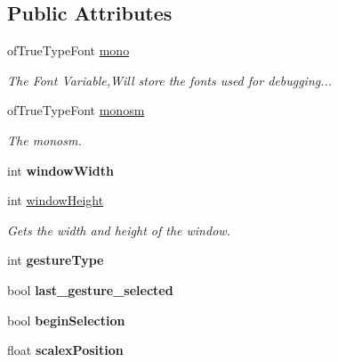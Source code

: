 \subsection*{Public Attributes}
\begin{DoxyCompactItemize}
\item 
\hypertarget{classtest_app_a9bcefa3afb830941451f72174a36b722}{of\-True\-Type\-Font \hyperlink{classtest_app_a9bcefa3afb830941451f72174a36b722}{mono}}\label{classtest_app_a9bcefa3afb830941451f72174a36b722}

\begin{DoxyCompactList}\small\item\em The Font Variable,Will store the fonts used for debugging... \end{DoxyCompactList}\item 
\hypertarget{classtest_app_afc42ad25d37b1292d27d783380249424}{of\-True\-Type\-Font \hyperlink{classtest_app_afc42ad25d37b1292d27d783380249424}{monosm}}\label{classtest_app_afc42ad25d37b1292d27d783380249424}

\begin{DoxyCompactList}\small\item\em The monosm. \end{DoxyCompactList}\item 
\hypertarget{classtest_app_a9ed611377cd46f5148a3a3d538e96484}{int {\bfseries window\-Width}}\label{classtest_app_a9ed611377cd46f5148a3a3d538e96484}

\item 
int \hyperlink{classtest_app_a31efaa85f8a900bb659a537d56c73e03}{window\-Height}
\begin{DoxyCompactList}\small\item\em Gets the width and height of the window. \end{DoxyCompactList}\item 
\hypertarget{classtest_app_a0db6626782419f4340a3186e51788074}{int {\bfseries gesture\-Type}}\label{classtest_app_a0db6626782419f4340a3186e51788074}

\item 
\hypertarget{classtest_app_a75ac9dc8ee1df4ae07b93a9b74131924}{bool {\bfseries last\-\_\-gesture\-\_\-selected}}\label{classtest_app_a75ac9dc8ee1df4ae07b93a9b74131924}

\item 
\hypertarget{classtest_app_aa2d09c9954dc56b2aaacc99d05948885}{bool {\bfseries begin\-Selection}}\label{classtest_app_aa2d09c9954dc56b2aaacc99d05948885}

\item 
\hypertarget{classtest_app_afea17ef4df91c9cd446cd99f9b8e2ddb}{float {\bfseries scalex\-Position}}\label{classtest_app_afea17ef4df91c9cd446cd99f9b8e2ddb}


\end{DoxyCompactItemize}
